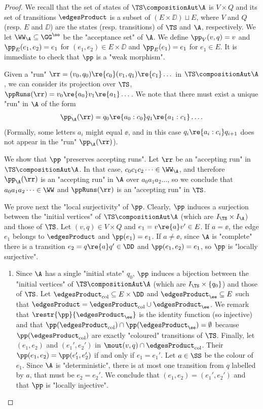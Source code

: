 \documentclass{theoretics}
\begin{document}
\begin{proof}
	We recall that the set of states of $\TS \compositionAut \A$ is $V\times Q$ and its set of transitions $\edgesProduct$ is a subset of $(E\times \DD) \sqcup E$, where $V$ and $Q$ (resp. $E$ and $\DD$) are the states (resp. transitions) of $\TS$ and $\A$, respectively.
	We let $\WW_\A\subseteq \GG^\oo$ be the "acceptance set" of $\A$.
	We define $\pp_V(v,q) = v$ and $\pp_E(e_1,e_2) = e_1$ for $(e_1,e_2)\in E\times \DD$ and $\pp_E(e_1) = e_1$ for $e_1\in E$.
	It is immediate to check that $\pp$ is a "weak morphism". 
	
	Given a "run" $\rr = (v_0,q_0) \re{c_0}  (v_1,q_1) \re{c_1} \dots$ in $\TS \compositionAut \A$, we can consider its projection over $\TS$, $\ppRuns(\rr) = v_0 \re{a_0}  v_1 \re{a_1} \dots$. We note that there must exist a unique "run" in $\A$ of the form 
	\[ \pp_\A(\rr) = q_0 \re{a_0:c_0}  q_1 \re{a_1:c_1} \dots .\]
	(Formally, some letters $a_i$ might equal $\ee$, and in this case $q_{i} \re{a_i:c_i}  q_{i+1}$ does not appear in the "run" $\pp_\A(\rr)$). 
	
	We show that $\pp$ "preserves accepting runs". Let $\rr$ be an "accepting run" in $\TS\compositionAut \A$. In that case, $c_0c_1c_2\dots \in \WW_\A$, and therefore $\pp_\A(\rr)$ is an "accepting run" in $\A$ over $a_0a_1a_2\dots$, so we conclude that $a_0a_1a_2\dots\in \WW$ and $\ppRuns(\rr)$ is an "accepting run" in $\TS$.
	
	We prove next the "local surjectivity" of $\pp$. Clearly, $\pp$ induces a surjection between the "initial vertices" of $\TS \compositionAut \A$ (which are $I_\TS \times I_\A$) and those of $\TS$. 
	Let $(v,q)\in V\times Q$ and $e_1 = v\re{a}v'\in E$. If $a=\ee$, the edge $e_1$ belongs to $\edgesProduct$ and $\pp(e_1)=e_1$. If $a\neq \ee$, since $\A$ is "complete" there is a transition $e_2 = q\re{a}q'\in \DD$ and $\pp(e_1,e_2) = e_1$, so $\pp$ is "locally surjective".
	
	\begin{enumerate}
		
		\item Since $\A$ has a single "initial state" $q_0$, $\pp$ induces a bijection between the "initial vertices" of $\TS \compositionAut \A$ (which are $I_\TS \times \{q_0\}$) and those of $\TS$.
		Let $\edgesProduct_\mathrm{col}\subseteq E\times \DD$ and $\edgesProduct_\ee\subseteq E$ such that $\edgesProduct = \edgesProduct_\mathrm{col} \cup \edgesProduct_\ee$. We remark that $\restr{\pp}{\edgesProduct_\ee}$ is the identity function (so injective) and that $\pp(\edgesProduct_\mathrm{col}) \cap \pp(\edgesProduct_\ee) = \emptyset$ because $\pp(\edgesProduct_\mathrm{col})$ are exactly "coloured" transitions of $\TS$. Finally, let $(e_1, e_2)$ and $(e_1', e_2')$ in $\mout(v,q) \cap \edgesProduct_\mathrm{col}$. Their $\pp(e_1, e_2) = \pp(e_1', e_2')$ if and only if $e_1 = e_1'$. Let $a\in \SS$ be the colour of $e_1$. Since $\A$ is "deterministic", there is at most one transition from $q$ labelled by $a$, that must be $e_2=e_2'$. We conclude that $(e_1, e_2)=(e_1', e_2')$ and that $\pp$ is "locally injective".
		

\end{enumerate}
\end{proof}
\end{document}
